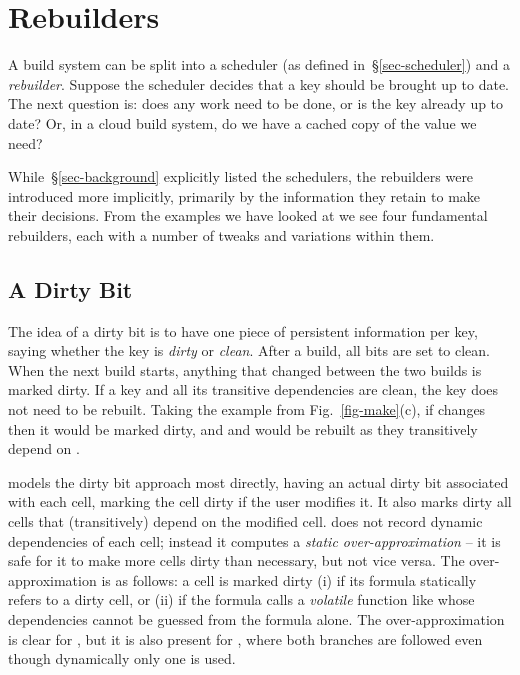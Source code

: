 \section{Rebuilders}\label{sec-rebuilder}

A build system can be split into a scheduler (as defined
in~\S\ref{sec-scheduler}) and a \emph{rebuilder}. Suppose the scheduler decides
that a key should be brought up to date. The next question is: does any work
need to be done, or is the key already up to date? Or, in a cloud build system,
do we have a cached copy of the value we need?

While~\S\ref{sec-background} explicitly listed the schedulers, the rebuilders
were introduced more implicitly, primarily by the information they retain to
make their decisions. From the examples we have looked at we see four
fundamental rebuilders, each with a number of tweaks and variations within them.

\subsection{A Dirty Bit}\label{sec-dirty-bit}

The idea of a dirty bit is to have one piece of persistent information per key,
saying whether the key is \emph{dirty} or \emph{clean}. After a build, all bits
are set to clean. When the next build starts, anything that changed between the
two builds is marked dirty. If a key and all its transitive dependencies are
clean, the key does not need to be rebuilt. Taking the example from
Fig.~\ref{fig-make}(c), if  changes then it would be marked dirty,
and  and  would be rebuilt as they transitively depend
on .

\Excel models the dirty bit approach most directly, having an actual dirty bit
associated with each cell, marking the cell dirty if the user modifies it.
It also marks dirty all cells that (transitively) depend on the modified cell.
\Excel does not record dynamic dependencies of each cell; instead it computes a
\emph{static over-approximation} -- it is safe for it to make more cells dirty
than necessary, but not vice versa. The over-approximation is as follows: a cell
is marked dirty (i) if its formula statically refers to a dirty cell, or (ii) if
the formula calls a \emph{volatile} function like  whose
dependencies cannot be guessed from the formula alone. The over-approximation is
clear for , but it is also present for , where both
branches are followed even though dynamically only one is used.

